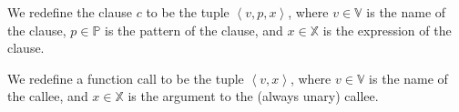 \begin{definition}\label{definition:unary-clause} We redefine the clause $c$ to
be the tuple $\left\langle v,p,x\right\rangle$, where $v\in\mathbb{V}$ is the
name of the clause, $p\in\mathbb{P}$ is the pattern of the clause, and
$x\in\mathbb{X}$ is the expression of the clause.\end{definition}

\begin{definition}\label{definition:unary-function-call} We redefine a function
call to be the tuple $\left\langle v,x\right\rangle$, where $v\in\mathbb{V}$ is
the name of the callee, and $x\in\mathbb{X}$ is the argument to the (always
unary) callee.\end{definition}

